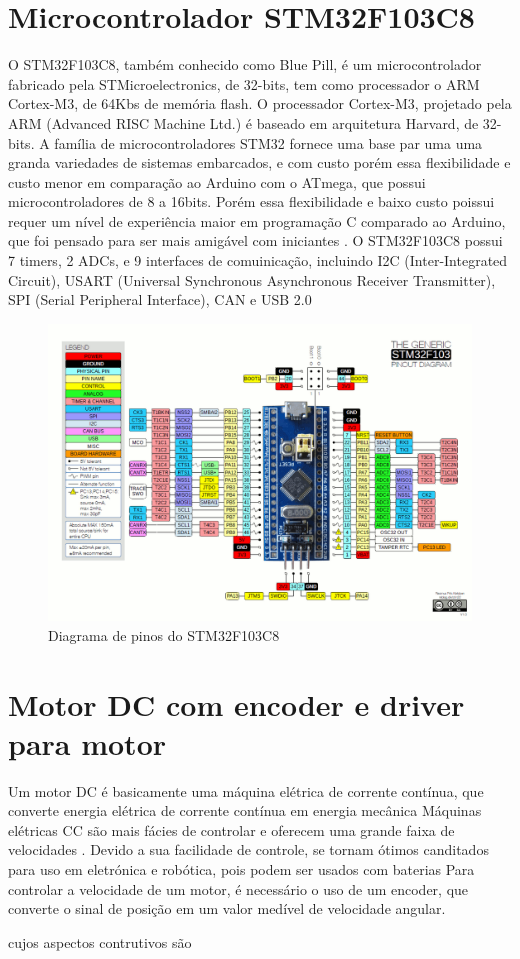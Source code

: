 \section{Microcontrolador STM32F103C8}
O STM32F103C8, também conhecido como Blue Pill, é um microcontrolador fabricado pela STMicroelectronics, de 32-bits, tem como processador o ARM Cortex-M3, de 64Kbs de memória flash.
O processador Cortex-M3, projetado pela ARM (Advanced RISC Machine Ltd.) é  baseado em arquitetura Harvard, de 32-bits.
A família de microcontroladores STM32 fornece uma base par uma uma granda variedades de sistemas embarcados,  e com custo porém essa flexibilidade e custo menor em comparação ao Arduino com o ATmega, que possui microcontroladores de 8 a 16bits.
Porém essa flexibilidade e baixo custo poissui requer um nível de experiência maior em programação C comparado ao Arduino, que foi pensado para ser mais amigável com iniciantes \cite{cortex_m3}.
O STM32F103C8 possui 7 timers, 2 ADCs, e 9 interfaces de comuinicação, incluindo I2C (Inter-Integrated Circuit), USART (Universal Synchronous Asynchronous Receiver Transmitter), SPI (Serial Peripheral Interface), CAN e USB 2.0


\begin{figure}[h]
	\centering
	\includegraphics[width=1.0\textwidth]{figures/stm32f1_pinout}
	\caption{Diagrama de pinos do STM32F103C8}
\end{figure}


\section{Motor DC com encoder e driver para motor}

Um motor DC é basicamente uma máquina elétrica de corrente contínua, que converte energia elétrica de corrente contínua em energia mecânica
Máquinas elétricas CC são mais fácies de controlar e oferecem uma grande faixa de velocidades \cite{Maquinas_eletricas}.
Devido a sua facilidade de controle, se tornam ótimos canditados para uso em eletrónica e robótica, pois podem ser usados com baterias
Para controlar a velocidade de um motor, é necessário o uso de um encoder, que converte o sinal de posição em um valor medível de velocidade angular.




cujos aspectos contrutivos são 



